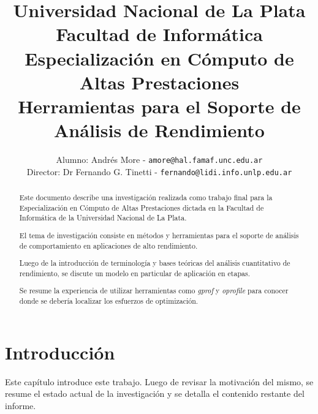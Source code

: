 \documentclass[a4paper]{report}
\begin{document}
\title{
  Universidad Nacional de La Plata\\Facultad de Inform\'atica\\
  \bigskip
  Especializaci\'on en C\'omputo de Altas Prestaciones\\
  \bigskip
  Herramientas para el Soporte de An\'alisis de Rendimiento
}

\author{
  Alumno: Andr\'es More - {\tt amore@hal.famaf.unc.edu.ar}\\
  Director: Dr Fernando G. Tinetti - {\tt fernando@lidi.info.unlp.edu.ar}
}


\maketitle

\begin{abstract}

  \bigskip

  Este documento describe una investigaci\'on realizada como trabajo final para
  la Especializaci\'on en C\'omputo de Altas Prestaciones dictada en la Facultad
  de Inform\'atica de la Universidad Nacional de La Plata.

  \bigskip

  El tema de investigaci\'on consiste en m\'etodos y herramientas para el soporte
  de an\'alisis de comportamiento en aplicaciones de alto rendimiento.

  \bigskip

  Luego de la introducci\'on de terminolog\'ia y bases te\'oricas del an\'alisis cuantitativo
  de rendimiento, se discute un modelo en particular de aplicaci\'on en etapas.

  \bigskip

  Se resume la experiencia de utilizar herramientas como {\it gprof} y {\it oprofile}
  para conocer donde se deber\'ia localizar los esfuerzos de optimizaci\'on.

\end{abstract}

\tableofcontents

\chapter{Introducci\'on}

Este cap\'itulo introduce este trabajo. Luego de revisar la motivaci\'on del mismo,
se resume el estado actual de la investigaci\'on y se detalla el contenido restante
del informe.
\end{document}
